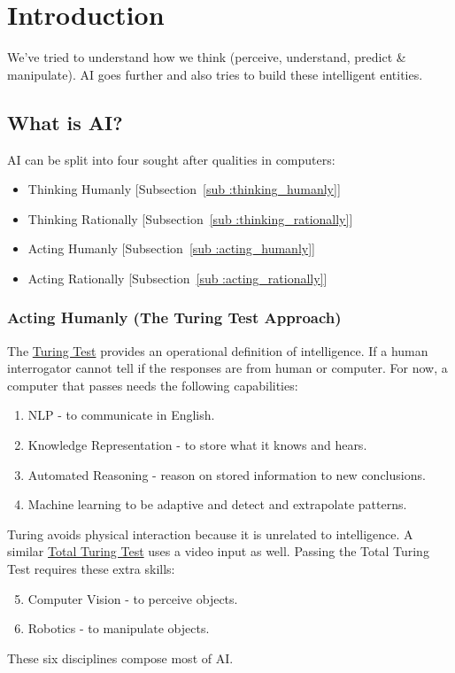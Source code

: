 \chapter{Introduction} %
\label{cha:introduction}

We've tried to understand how we think (perceive, understand, predict \&
manipulate). AI goes further and also tries to build these intelligent entities.

\section{What is AI?} %
\label{sec:what_is_ai_}
AI can be split into four sought after qualities in computers:
\begin{itemize}
    \item Thinking Humanly [Subsection~\ref{sub
:thinking_humanly}]
    \item Thinking Rationally [Subsection~\ref{sub
:thinking_rationally}]
    \item Acting Humanly [Subsection~\ref{sub
:acting_humanly}]
    \item Acting Rationally [Subsection~\ref{sub
:acting_rationally}]
\end{itemize}

\subsection{Acting Humanly (The Turing Test Approach)} %
\label{sub:acting_humanly}
The \uline{Turing Test} provides an operational definition of intelligence.
If a human interrogator cannot tell if the responses are from human or computer.
For now, a computer that passes needs the following capabilities:
\begin{enumerate}
    \item NLP - to communicate in English.
    \item Knowledge Representation - to store what it knows and hears.
    \item Automated Reasoning - reason on stored information to new conclusions.
    \item Machine learning to be adaptive and detect and extrapolate patterns.
\end{enumerate}
Turing avoids physical interaction because it is unrelated to intelligence.
A similar \uline{Total Turing Test} uses a video input as well.
Passing the Total Turing Test requires these extra skills:
\begin{enumerate}
    \setcounter{enumi}{4}
    \item Computer Vision - to perceive objects.
    \item Robotics - to manipulate objects.
\end{enumerate}
These six disciplines compose most of AI.


